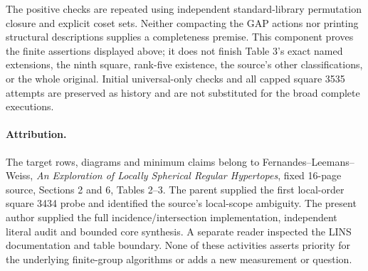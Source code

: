 \documentclass[11pt]{article}
\begin{document}
The positive checks are repeated using independent standard-library
permutation closure and explicit coset sets. Neither compacting the GAP
actions nor printing structural descriptions supplies a completeness
premise. This component proves the finite assertions displayed above;
it does not finish Table 3's exact named extensions, the ninth square,
rank-five existence, the source's other classifications, or the whole
original. Initial universal-only checks and all capped square 3535
attempts are preserved as history and are not substituted for the broad
complete executions.

\paragraph{Attribution.}
The target rows, diagrams and minimum claims belong to
Fernandes--Leemans--Weiss, \emph{An Exploration of Locally Spherical
Regular Hypertopes}, fixed 16-page source, Sections 2 and 6, Tables 2--3.
The parent supplied the first local-order square 3434 probe and identified
the source's local-scope ambiguity. The present author supplied the full
incidence/intersection implementation, independent literal audit and
bounded core synthesis. A separate reader inspected the LINS documentation
and table boundary. None of these activities asserts priority for the
underlying finite-group algorithms or adds a new measurement or question.
\end{document}
